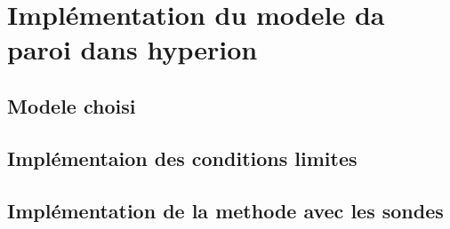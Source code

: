 \section{Implémentation du modele da paroi dans hyperion}
\subsection{Modele choisi}
\subsection{Implémentaion des conditions limites}
\subsection{Implémentation de la methode avec les sondes}
